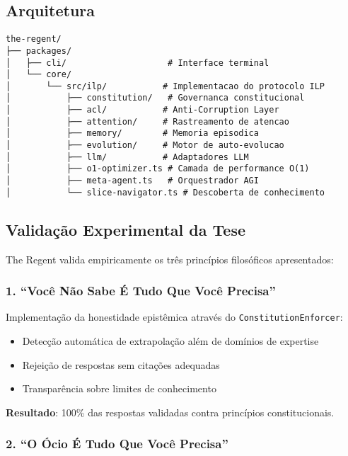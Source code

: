 \documentclass[11pt]{article}
\begin{document}
\subsection{Arquitetura}

\begin{lstlisting}[basicstyle=\ttfamily\scriptsize]
the-regent/
├── packages/
│   ├── cli/                    # Interface terminal
│   └── core/
│       └── src/ilp/           # Implementacao do protocolo ILP
│           ├── constitution/   # Governanca constitucional
│           ├── acl/           # Anti-Corruption Layer
│           ├── attention/     # Rastreamento de atencao
│           ├── memory/        # Memoria episodica
│           ├── evolution/     # Motor de auto-evolucao
│           ├── llm/           # Adaptadores LLM
│           ├── o1-optimizer.ts # Camada de performance O(1)
│           ├── meta-agent.ts   # Orquestrador AGI
│           └── slice-navigator.ts # Descoberta de conhecimento
\end{lstlisting}

\subsection{Validação Experimental da Tese}

The Regent valida empiricamente os três princípios filosóficos apresentados:

\subsubsection{1. ``Você Não Sabe É Tudo Que Você Precisa''}

Implementação da honestidade epistêmica através do \texttt{ConstitutionEnforcer}:

\begin{itemize}
    \item Detecção automática de extrapolação além de domínios de expertise
    \item Rejeição de respostas sem citações adequadas
    \item Transparência sobre limites de conhecimento
\end{itemize}

\textbf{Resultado}: 100\% das respostas validadas contra princípios constitucionais.

\subsubsection{2. ``O Ócio É Tudo Que Você Precisa''}
\end{document}

